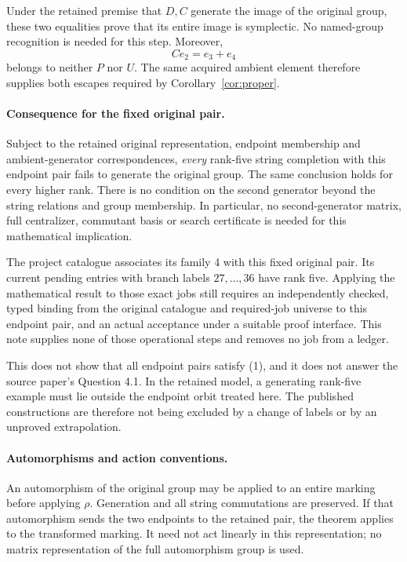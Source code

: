 \documentclass[11pt]{article}
\begin{document}
Under the retained premise that \(D,C\) generate the image of the
original group, these two equalities prove that its entire image
is symplectic. No named-group recognition is needed for this step.
Moreover,
\[
                         Ce_2=e_3+e_4
\]
belongs to neither \(P\) nor \(U\).
The same acquired ambient element therefore supplies both escapes
required by Corollary~\ref{cor:proper}.

\paragraph{Consequence for the fixed original pair.}
Subject to the retained original representation, endpoint membership
and ambient-generator correspondences, \emph{every} rank-five string
completion with this endpoint pair fails to generate the original
group. The same conclusion holds for every higher rank.
There is no condition on the second generator beyond the string
relations and group membership. In particular, no second-generator
matrix, full centralizer, commutant basis or search certificate is
needed for this mathematical implication.

The project catalogue associates its family 4 with this fixed
original pair. Its current pending entries with branch labels
\(27,\ldots,36\) have rank five. Applying the mathematical result
to those exact jobs still requires an independently checked,
typed binding from the original catalogue and required-job universe
to this endpoint pair, and an actual acceptance under a suitable
proof interface. This note supplies none of those operational
steps and removes no job from a ledger.

This does not show that all endpoint pairs satisfy (1), and it does not
answer the source paper's Question 4.1. In the retained model, a
generating rank-five example must lie outside the endpoint orbit
treated here. The published constructions are therefore not being
excluded by a change of labels or by an unproved extrapolation.

\paragraph{Automorphisms and action conventions.}
An automorphism of the original group may be applied to an entire
marking before applying \(\rho\). Generation and all string
commutations are preserved. If that automorphism sends the two
endpoints to the retained pair, the theorem applies to the
transformed marking. It need not act linearly in this
representation; no matrix representation of the full automorphism
group is used.
\end{document}
